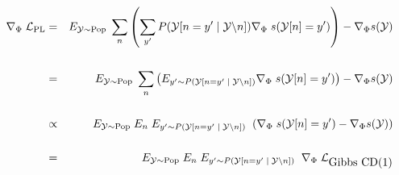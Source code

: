 {

{\huge
\begin{eqnarray*}
\nabla_\Phi\;{\cal L}_{\mathrm{PL}} & = & E_{{\cal Y} \sim \mathrm{Pop}}\;\sum_n \left(\sum_{y'} P({\cal Y}[n=y'\;|\;{\cal Y}\backslash n]) \nabla_\Phi\;s({\cal Y}[n]=y')\right) - \nabla_\Phi s({\cal Y}) \\
\\
& = & E_{{\cal Y} \sim \mathrm{Pop}}\;\sum_n \left(E_{y' \sim P({\cal Y}[n=y'\;|\;{\cal Y}\backslash n])} \nabla_\Phi\;s({\cal Y}[n]=y')\right) - \nabla_\Phi s({\cal Y}) \\
\\
& \propto & E_{{\cal Y} \sim \mathrm{Pop}}\;E_n\; E_{y' \sim P({\cal Y}[n=y'\;|\;{\cal Y}\backslash n])}\;\; (\nabla_\Phi\;s({\cal Y}[n]=y') - \nabla_\Phi s({\cal Y})) \\
\\
& = & E_{{\cal Y} \sim \mathrm{Pop}}\;E_n\; E_{y' \sim P({\cal Y}[n=y'\;|\;{\cal Y}\backslash n])}\;\; \nabla_\Phi\;{\cal L}_{\mbox{Gibbs CD(1)}}
\end{eqnarray*}
}

}

